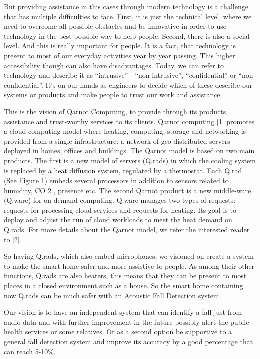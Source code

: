 \documentclass{article}
\begin{document}
But providing assistance in this cases through modern technology is a challenge that has multiple difficulties to face. First, it is just the technical level, where we need to overcome all possible obstacles and be innovative in order to use technology in the best possible way to help people. Second, there is also a social level. And this is really important for people. It is a fact, that technology is present to most of our everyday activities year by year passing. This higher accessibility though can also have disadvantages. Today, we can refer to technology and describe it as “intrusive” - “non-intrusive”, “confidential” or “non-confidential”. It's on our hands as engineers to decide which of these describe our systems or products and make people to trust our work and assistance. 

This is the vision of Qarnot Computing, to provide through its products assistance and trust-worthy services to its clients. Qarnot computing [1] promotes a cloud computing model where heating, computing, storage and networking is provided from a single infrastructure: a network of geo-distributed servers deployed in homes, offices and buildings. The Qarnot model is based on two main products. The first is a new model of servers (Q.rads) in which the cooling system is replaced by a heat diffusion system, regulated by a thermostat. Each Q.rad (See Figure 1) embeds several processors in addition to sensors related to humidity, CO 2 , presence etc. The second Qarnot product is a new middle-ware (Q.ware) for on-demand computing. Q.ware manages two types of requests: requests for processing cloud services and requests for heating. Its goal is to deploy and adjust the run of cloud workloads to meet the heat demand on Q.rads. For more details about the Qarnot model, we refer the interested reader to [2].

So having Q.rads, which also embed microphones, we visioned on create a system to make the smart home safer and more assistive to people. As among their other functions, Q.rads are also heaters, this means that they can be present to most places in a closed environment such as a house. So the smart home containing now Q.rads can be much safer with an Acoustic Fall Detection system. 

Our vision is to have an independent system that can identify a fall just from audio data and with further improvement in the future possibly alert the public health services or some relatives. Or as a second option be supportive to a general fall detection system and improve its accuracy by a good percentage that can reach 5-10\%. 
\end{document}
